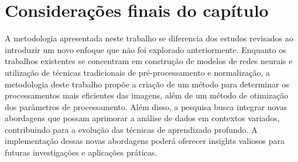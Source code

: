 \section{Considerações finais do capítulo}

A metodologia apresentada neste trabalho se diferencia dos estudos revisados ao introduzir um novo enfoque que não foi explorado anteriormente. Enquanto os trabalhos existentes se concentram em construção de modelos de redes neurais e utilização de técnicas tradicionais de pré-processamento e normalização, a metodologia deste trabalho propõe a criação de um método para determinar os processamentos mais eficientes das imagens, além de um método de otimização dos parâmetros de processamento. Além disso, a pesquisa busca integrar novas abordagens que possam aprimorar a análise de dados em contextos variados, contribuindo para a evolução das técnicas de aprendizado profundo. A implementação dessas novas abordagens poderá oferecer insights valiosos para futuras investigações e aplicações práticas.